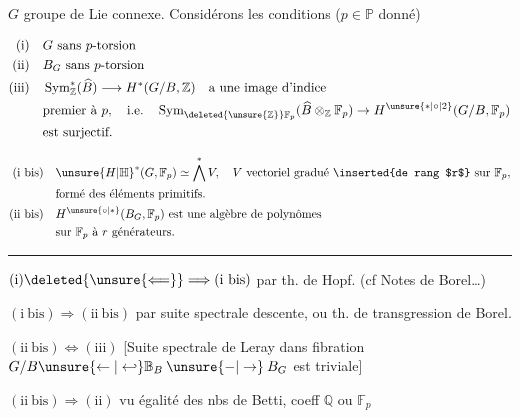 $G$ groupe de Lie  connexe. Considérons les conditions ($p\in\mathbb P$ donné)

\[
\begin{aligned}
\mathrm{(i)}\quad &G\text{ sans }p\text{-torsion}\\
\mathrm{(ii)}\quad &B_G\text{ sans }p\text{-torsion}\\
\mathrm{(iii)}\quad &\operatorname{Sym}^{*}_{\mathbb Z}(\widehat B)\longrightarrow H^*(G/B,\mathbb Z)
  \quad\text{a une image d'indice}\\
&\text{premier à }p,\quad\text{i.e.}\quad
  \operatorname{Sym}_{\deleted{\unsure{\mathbb Z}}\mathbb F_p}(\widehat B\otimes_{\mathbb Z}\mathbb F_p)\to H^{\unsure{*|\circ|2}}(G/B,\mathbb F_p)\\
&\text{est surjectif.}
\end{aligned}
\]

\[
\begin{aligned}
\mathrm{(i\ bis)}\quad &{\unsure{H|\mathbb H}}^{*}(G,\mathbb F_p)\simeq\bigwedge^{*}V,\quad V\text{ vectoriel gradué \inserted{de rang $r$} sur }\mathbb F_p,\\
&\text{formé des éléments primitifs.}\\
\mathrm{(ii\ bis)}\quad &H^{\unsure{\circ|*}}(B_G,\mathbb F_p)\text{ est une algèbre de polynômes}\\
&\text{sur }\mathbb F_p\text{ à }r\text{ générateurs.}
\end{aligned}
\]

\par\noindent\hfil\rule{.47\linewidth}{.4pt}\hfil\par


$\mathrm{(i)}\deleted{\unsure{\Longleftarrow}}\Longrightarrow\mathrm{(i\ bis)}$ par th. de Hopf. (cf Notes de Borel\ldots{})

$\mathrm{(i\ bis)}\Longrightarrow\mathrm{(ii\ bis)}$ par suite spectrale  descente, ou th. de transgression de Borel.

$\mathrm{(ii\ bis)}\Longleftrightarrow\mathrm{(iii)}$ [Suite spectrale de Leray dans fibration $G/B\unsure{\leftarrow|\hookleftarrow}\mathbb B_B\mathbin{\unsure{-|\to}}B_G$ est triviale] 

$\mathrm{(ii\ bis)}\Longrightarrow\mathrm{(ii)}$ vu égalité des nbs de Betti, coeff $\mathbb Q$ ou $\mathbb F_p$

